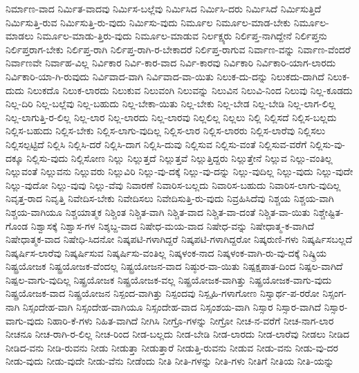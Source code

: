{ನಿರ್ಮಾಣ-ವಾದ
ನಿರ್ಮಿತ-ವಾದವು
ನಿರ್ಮಿಸ-ಬಲ್ಲೆವು
ನಿರ್ಮಿಸಿದ
ನಿರ್ಮಿಸಿ-ದರು
ನಿರ್ಮಿಸಿದೆ
ನಿರ್ಮಿಸುತ್ತಿದೆ
ನಿರ್ಮಿಸುತ್ತಿ-ರುವ
ನಿರ್ಮಿಸುತ್ತಿ-ರು-ವುದು
ನಿರ್ಮಿಸು-ವುದು
ನಿರ್ಮೂಲ
ನಿರ್ಮೂಲ-ಮಾಡ-ಬೇಕು
ನಿರ್ಮೂಲ-ಮಾಡಲು
ನಿರ್ಮೂಲ-ಮಾಡು-ತ್ತಿರು-ವುದು
ನಿರ್ಮೂಲ-ಮಾಡುವ
ನಿರ್ಲಕ್ಷ್ಯರು
ನಿರ್ಲಿಪ್ತ-ನಾಗಿದ್ದೇನೆ
ನಿರ್ಲಿಪ್ತನು
ನಿರ್ಲಿಪ್ತರಾಗ-ಬೇಕು
ನಿರ್ಲಿಪ್ತ-ರಾಗಿ
ನಿರ್ಲಿಪ್ತ-ರಾಗಿ-ರ-ಬೇಕಾದರೆ
ನಿರ್ಲಿಪ್ತ-ರಾಗುವ
ನಿರ್ವಾಣ-ವನ್ನು
ನಿರ್ವಾಣ-ವೆಂದರೆ
ನಿರ್ವಾಣವೇ
ನಿರ್ವಾಹ-ವಿಲ್ಲ
ನಿರ್ವಿಕಾರ
ನಿರ್ವಿ-ಕಾರ-ವಾದ
ನಿರ್ವಿ-ಕಾರವು
ನಿರ್ವಿಕಾರಿ
ನಿರ್ವಿಕಾರಿ-ಯಾಗ-ಲಾರದು
ನಿರ್ವಿಕಾರಿ-ಯಾ-ಗಿ-ರುವುದು
ನಿರ್ವಿವಾದ-ವಾಗಿ
ನಿರ್ವಿವಾದ-ವಾ-ಯಿತು
ನಿಲುಕ-ದು-ದನ್ನು
ನಿಲುಕದು-ದಾಗಿದೆ
ನಿಲುಕ-ದುದು
ನಿಲುಕದೊ
ನಿಲುಕ-ಲಾರದು
ನಿಲುಕುವ
ನಿಲುವಂಗಿ
ನಿಲುವನ್ನು
ನಿಲುವಿನ
ನಿಲುವಿ-ನಿಂದ
ನಿಲುವು
ನಿಲ್ಲ-ಕೂಡದು
ನಿಲ್ಲ-ದಿರಿ
ನಿಲ್ಲ-ಬಲ್ಲೆವು
ನಿಲ್ಲ-ಬಹುದು
ನಿಲ್ಲ-ಬೇಕಾ-ಯಿತು
ನಿಲ್ಲ-ಬೇಕು
ನಿಲ್ಲ-ಬೇಡ
ನಿಲ್ಲ-ಬೇಡಿ
ನಿಲ್ಲ-ಲಾಗ-ಲಿಲ್ಲ
ನಿಲ್ಲ-ಲಾಗುತ್ತಿ-ರ-ಲಿಲ್ಲ
ನಿಲ್ಲ-ಲಾರ
ನಿಲ್ಲ-ಲಾರದು
ನಿಲ್ಲ-ಲಾರವು
ನಿಲ್ಲಲಿಲ್ಲ
ನಿಲ್ಲಲು
ನಿಲ್ಲಿ
ನಿಲ್ಲಿಸದೆ
ನಿಲ್ಲಿಸ-ಬಲ್ಲದು
ನಿಲ್ಲಿಸ-ಬಹುದು
ನಿಲ್ಲಿಸ-ಬೇಕು
ನಿಲ್ಲಿಸ-ಲಾಗು-ವುದಿಲ್ಲ
ನಿಲ್ಲಿಸ-ಲಾರ
ನಿಲ್ಲಿಸ-ಲಾರರು
ನಿಲ್ಲಿಸ-ಲಾರೆವು
ನಿಲ್ಲಿಸಲು
ನಿಲ್ಲಿಸಲ್ಪಟ್ಟಿದೆ
ನಿಲ್ಲಿಸಿ
ನಿಲ್ಲಿಸಿ-ದರೆ
ನಿಲ್ಲಿಸಿ-ದಾಗ
ನಿಲ್ಲಿಸಿ-ದುವು
ನಿಲ್ಲಿಸುವ
ನಿಲ್ಲಿಸು-ವಂತೆ
ನಿಲ್ಲಿಸುವ-ವರೆಗೆ
ನಿಲ್ಲಿಸು-ವು-ದಕ್ಕೂ
ನಿಲ್ಲಿಸು-ವುದು
ನಿಲ್ಲಿಸೋಣ
ನಿಲ್ಲು
ನಿಲ್ಲುತ್ತದೆ
ನಿಲ್ಲುತ್ತವೆ
ನಿಲ್ಲುತ್ತಿದ್ದರು
ನಿಲ್ಲುತ್ತೇನೆ
ನಿಲ್ಲುವ
ನಿಲ್ಲು-ವಂತಿಲ್ಲ
ನಿಲ್ಲುವಂತೆ
ನಿಲ್ಲುವನು
ನಿಲ್ಲುವರು
ನಿಲ್ಲುವಿರಿ
ನಿಲ್ಲು-ವು-ದಕ್ಕೆ
ನಿಲ್ಲು-ವು-ದನ್ನು
ನಿಲ್ಲು-ವುದಿಲ್ಲ
ನಿಲ್ಲು-ವುದು
ನಿಲ್ಲು-ವುದೇ
ನಿಲ್ಲು-ವುದೋ
ನಿಲ್ಲು-ವುವು
ನಿಲ್ಲು-ವೆವು
ನಿವಾರಣೆ
ನಿವಾರಿಸ-ಬಲ್ಲದು
ನಿವಾರಿಸ-ಬಹುದು
ನಿವಾರಿಸ-ಲಾಗು-ವುದಿಲ್ಲ
ನಿವೃತ್ತ-ರಾದ
ನಿವೃತ್ತಿ
ನಿವೇದಿಸ-ಬೇಕು
ನಿವೇದಿಸಲು
ನಿವೇದಿಸುತ್ತಿ-ರು-ವುದು
ನಿವ್ರಹಿಸಿದೆವು
ನಿಶ್ಚಯ
ನಿಶ್ಚಯ-ವಾಗಿ
ನಿಶ್ಚಯ-ವಾಗಿಯೂ
ನಿಶ್ಚಯಾತ್ಮಕ
ನಿಶ್ಚಿಂತ
ನಿಶ್ಚಿತ-ವಾಗಿ
ನಿಶ್ಚಿತ-ವಾದ
ನಿಶ್ಚಿತ-ವಾ-ದಂತೆ
ನಿಶ್ಚಿತ-ವಾ-ಯಿತು
ನಿಶ್ಚೇಷ್ಟಿತ-ಗೊಂಡ
ನಿಶ್ವಾಸಕ್ಕೆ
ನಿಶ್ವಾಸ-ಗಳ
ನಿಶ್ಶಬ್ದ-ವಾದ
ನಿಷೇಧ-ಮಯ-ವಾದ
ನಿಷೇಧ-ವನ್ನು
ನಿಷೇಧಾತ್ಮ-ಕ-ವಾಗಿದೆ
ನಿಷೇಧಾತ್ಮಕ-ವಾದ
ನಿಷೇಧಿ-ಸಿದನೋ
ನಿಷ್ಕಪಟಿ-ಗಳಾಗಿದ್ದರೆ
ನಿಷ್ಕಪಟಿ-ಗಳಾಗಿದ್ದರೋ
ನಿಷ್ಕರುಣಿ-ಗಳು
ನಿಷ್ಕರ್ಷಿಸಬಲ್ಲದೆ
ನಿಷ್ಕರ್ಷಿಸ-ಲಾರೆವು
ನಿಷ್ಕರ್ಷಿಸುವ
ನಿಷ್ಕರ್ಷಿಸು-ವಂತಿಲ್ಲ
ನಿಷ್ಕಳಂಕ-ನಾದ
ನಿಷ್ಕಳಂಕ-ವಾಗಿ-ರು-ವು-ದಕ್ಕೆ
ನಿಷ್ಕ್ರಿಯ
ನಿಷ್ಟ್ರಯೋಜಕ
ನಿಷ್ಟ್ರಯೋಜಕ-ವೆಂದಲ್ಲ
ನಿಷ್ಟ್ರಯೋಜನ-ವಾದ
ನಿಷ್ಠುರ-ವಾ-ಯಿತು
ನಿಷ್ಪಕ್ಷಪಾತ-ದಿಂದ
ನಿಷ್ಪಲ-ವಾಗಿದೆ
ನಿಷ್ಪಲ-ವಾಗು-ವುದಿಲ್ಲ
ನಿಷ್ಪ್ರಯೋಜಕ
ನಿಷ್ಪ್ರಯೋಜಕ-ವಲ್ಲ
ನಿಷ್ಪ್ರಯೋಜಕ-ವಾಗಿತ್ತು
ನಿಷ್ಪ್ರಯೋಜಕ-ವಾಗು-ವುದು
ನಿಷ್ಪ್ರಯೋಜಕ-ವಾದ
ನಿಷ್ಪ್ರಯೋಜನ
ನಿಸ್ಪಂದ-ವಾಗಿತ್ತು
ನಿಸ್ಪಂದವು
ನಿಸ್ಪೃಹಿ-ಗಳಾಗೋಣ
ನಿಸ್ವಾರ್ಥ-ಪ-ರರೋ
ನಿಸ್ಸಂಗ-ನಾಗಿ
ನಿಸ್ಸಂದೇಹ-ವಾಗಿ
ನಿಸ್ಸಂದೇಹ-ವಾಗಿಯೂ
ನಿಸ್ಸಂದೇಹ-ವಾದ
ನಿಸ್ಸಂಶಯ-ವಾಗಿ
ನಿಸ್ಸಾರ
ನಿಸ್ಸಾರ-ವಾಗಿದೆ
ನಿಸ್ಸಾರ-ವಾಗು-ವುದು
ನಿಹಾರಿ-ಕೆ-ಗಳು
ನಿಹಿತ-ವಾಗಿದೆ
ನೀಗಿಸಿ
ನೀಗ್ರೊ-ಗಳನ್ನು
ನೀಗ್ರೋ
ನೀಚ-ನ-ವರೆಗೆ
ನೀಚ-ನಾಗ-ಲಾರ
ನೀಚನೂ
ನೀಚ-ರಾಗಿ-ರ-ಲಿಲ್ಲ
ನೀಚ-ರಿಂದ
ನೀಡ-ಬಲ್ಲದು
ನೀಡ-ಬೇಡಿ
ನೀಡ-ಲಾರದು
ನೀಡ-ಲಾರೆವು
ನೀಡಲು
ನೀಡಿದ
ನೀಡಿದ-ವನು
ನೀಡಿ-ರುವನು
ನೀಡು
ನೀಡುತ್ತಾ
ನೀಡುತ್ತಾರೆ
ನೀಡುತ್ತಿ-ರುವನು
ನೀಡುವ
ನೀಡು-ವನು
ನೀಡು-ವು-ದರ
ನೀಡು-ವುದು
ನೀಡು-ವುದೇ
ನೀಡು-ವೆನು
ನೀಡೆಂದು
ನೀತಿ
ನೀತಿ-ಗಳನ್ನು
ನೀತಿ-ಗಳು
ನೀತಿಗೆ
ನೀತಿಯ
ನೀತಿ-ಯನ್ನು
}
